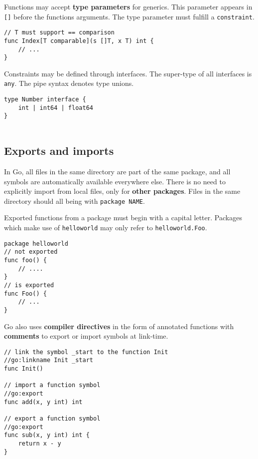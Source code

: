 \documentclass{article}
\begin{document}
\begin{paracol}{2}

Functions may accept \textbf{type parameters} for generics. This parameter appears in \lstinline|[]| before the functions arguments. The type parameter must fulfill a \lstinline|constraint|.
  
\switchcolumn
\begin{lstlisting}
// T must support == comparison
func Index[T comparable](s []T, x T) int {
    // ...
}

\end{lstlisting}
\switchcolumn*
\noindent Constraints may be defined through interfaces. The super-type of all interfaces is \lstinline|any|. The pipe syntax denotes type unions.

\switchcolumn

\begin{lstlisting}
type Number interface {
    int | int64 | float64
}
    
\end{lstlisting}

\end{paracol}

\subsection{Exports and imports}

\noindent In Go, all files in the same directory are part of the same package, and all symbols are automatically available everywhere else. There is no need to explicitly import from local files, only for \textbf{other packages}. Files in the same directory should all being with \lstinline{package NAME}.
\\

\begin{paracol}{2}

\noindent Exported functions from a package must begin with a capital letter. Packages which make use of \lstinline{helloworld} may only refer to \lstinline{helloworld.Foo}.

\switchcolumn

\begin{lstlisting}
package helloworld
// not exported
func foo() {
    // ....
}
// is exported
func Foo() {
    // ...
}
\end{lstlisting}

\switchcolumn*

\noindent Go also uses \textbf{compiler directives} in the form of annotated functions with \textbf{comments} to export or import symbols at link-time.

\switchcolumn

\begin{lstlisting}
// link the symbol _start to the function Init
//go:linkname Init _start
func Init() 

// import a function symbol
//go:export
func add(x, y int) int

// export a function symbol
//go:export
func sub(x, y int) int {
    return x - y
}


\end{lstlisting}

\end{paracol}
\end{document}
